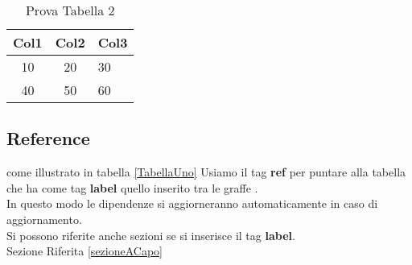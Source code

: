 \documentclass{article}
\begin{document}
\begin{table}[h!]
    \centering
    \begin{tabular}{c|c|l}
    \hline
    Col1 & Col2 & Col3 \\[0.5ex]
    \hline\hline
    10   &   20   &   30  \\
    40   &   50   &   60 \\ [5ex]
    \hline 
    \end{tabular}
    \caption{Prova Tabella 2}
    \label{TabellaDue}
\end{table}

\subsection{Reference}
come illustrato in tabella \ref{TabellaUno} Usiamo il tag \textbf{ref} per puntare alla tabella che ha come tag \textbf{label} quello inserito tra le graffe {}. \\
In questo modo le dipendenze si aggiorneranno automaticamente in caso di aggiornamento.\\
Si possono riferite anche sezioni se si inserisce il tag \textbf{label}. \\
Sezione Riferita \ref{sezioneACapo}
\end{document}
